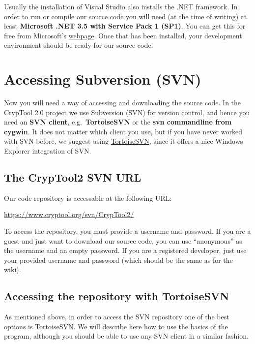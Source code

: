 Usually the installation of Visual Studio also installs the .NET framework. In order to run or compile our source code you will need (at the time of writing) at least \textbf{Microsoft .NET 3.5 with Service Pack 1 (SP1)}. You can get this for free from Microsoft's \href{http://download.microsoft.com/download/2/0/e/20e90413-712f-438c-988e-fdaa79a8ac3d/dotnetfx35.exe}{webpage}. Once that has been installed, your development environment should be ready for our source code.

\section{Accessing Subversion (SVN)}
\label{AccessingSubversion}

Now you will need a way of accessing and downloading the source code. In the CrypTool 2.0 project we use Subversion (SVN) for version control, and hence you need an \textbf{SVN client}, e.g.\ \textbf{TortoiseSVN} or the \textbf{svn commandline from cygwin}. It does not matter which client you use, but if you have never worked with SVN before, we suggest using \href{http://www.tortoisesvn.net/}{TortoiseSVN}, since it offers a nice Windows Explorer integration of SVN.
\clearpage

\subsection{The CrypTool2 SVN URL}
\label{TheCrypTool2SVNURL}

Our code repository is accessable at the following URL:

\url{https://www.cryptool.org/svn/CrypTool2/}

To access the repository, you must provide a username and password. If you are a guest and just want to download our source code, you can use ``anonymous'' as the username and an empty password. If you are a registered developer, just use your provided username and password (which should be the same as for the wiki).

\subsection{Accessing the repository with TortoiseSVN}
\label{AccessingTheRepositoryWithTortoiseSVN}

As mentioned above, in order to access the SVN repository one of the best options is \href{http://www.tortoisesvn.net/}{TortoiseSVN}. We will describe here how to use the basics of the program, although you should be able to use any SVN client in a similar fashion.

